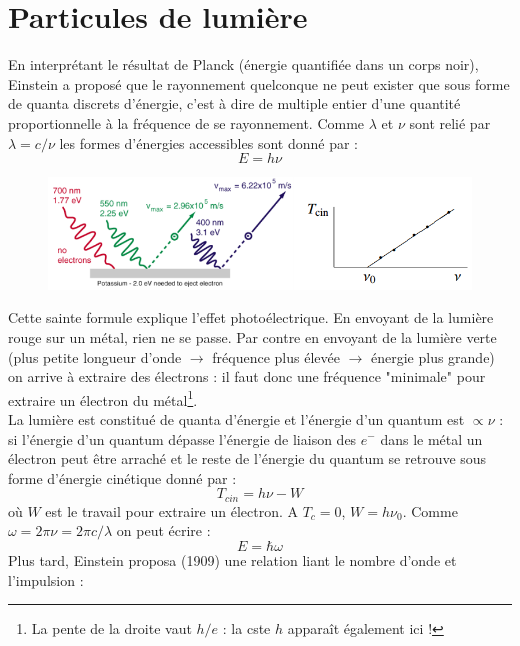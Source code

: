 \documentclass[british,french,11pt, a4paper, openany]{book}
\begin{document}
	\section{Particules de lumière}
	En interprétant le résultat de Planck (énergie quantifiée dans un corps noir), Einstein a proposé que le rayonnement quelconque ne peut exister que sous forme de quanta discrets d'énergie, c'est à dire de multiple entier d'une quantité proportionnelle à la fréquence de se rayonnement. Comme $\lambda$ et $\nu$ sont relié par $\lambda = c/\nu$ les formes d'énergies accessibles sont donné par :
	\begin{equation}
		E = h\nu
	\end{equation}
	\begin{figure}
		\includegraphics[scale=0.3]{img/image1.png}
	\end{figure}
	Cette sainte formule explique l'effet photoélectrique. En envoyant de la lumière rouge sur un métal, rien ne se passe. Par contre en envoyant de la lumière verte (plus petite longueur d'onde $\rightarrow$ fréquence plus élevée $\rightarrow$ énergie plus grande) on arrive à extraire des électrons : il faut donc une fréquence "minimale" pour extraire un électron du métal\footnote{La pente de la droite vaut $h/e$ : la cste $h$ apparaît également ici !}.\\
	La lumière est constitué de quanta d'énergie et l'énergie d'un quantum est $\propto \nu$ : si l'énergie d'un quantum dépasse l'énergie de liaison des $e^-$ dans le métal un électron peut être arraché et le reste de l'énergie du quantum se retrouve sous forme d'énergie cinétique donné par :
	\begin{equation}
		T_{cin} = h\nu - W
	\end{equation}
	où $W$ est le travail pour extraire un électron. A $T_c = 0$, $W = h\nu_0$. Comme $\omega = 2\pi \nu = 2\pi c /\lambda$ on peut écrire :
	\begin{equation}\label{eq:ehbaromega}
		E = \hbar \omega
	\end{equation}
	Plus tard, Einstein proposa (1909) une relation liant le nombre d'onde et l'impulsion :
\end{document}

